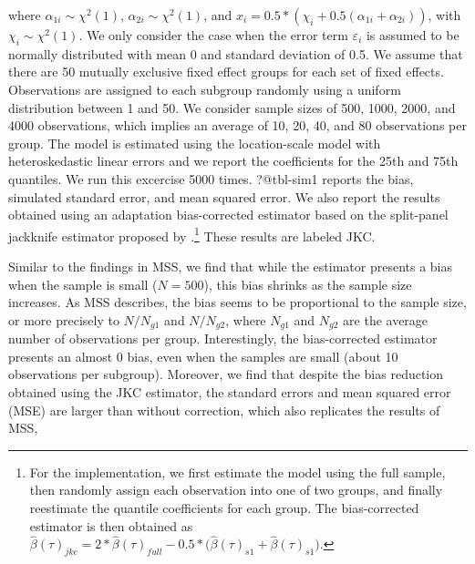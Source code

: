 \documentclass[
  authoryear,
  review,
  1p]{elsarticle}
\begin{document}
where \(\alpha_{1i}\sim \chi^2(1)\), \(\alpha_{2i} \sim \chi^2(1)\), and
\(x_i = 0.5 * (\chi_i +0.5(\alpha_{1i}+\alpha_{2i}))\), with
\(\chi_i \sim \chi^2(1)\). We only consider the case when the error term
\(\varepsilon_i\) is assumed to be normally distributed with mean 0
and standard deviation of 0.5. We assume that there are 50 mutually
exclusive fixed effect groups for each set of fixed effects.
Observations are assigned to each subgroup randomly using a uniform
distribution between 1 and 50. We consider sample sizes of 500, 1000,
2000, and 4000 observations, which implies an average of 10, 20, 40, and
80 observations per group. The model is estimated using the
location-scale model with heteroskedastic linear errors and we report
the coefficients for the 25th and 75th quantiles. We run this excercise
5000 times. ?@tbl-sim1 reports the bias, simulated standard
error, and mean squared error. We also report the results obtained using
an adaptation bias-corrected estimator based on the split-panel
jackknife estimator proposed by \citet{dhaene2015}.\footnote{For the
  implementation, we first estimate the model using the full sample, then
  randomly assign each observation into one of two groups, and finally
  reestimate the quantile coefficients for each group. The
  bias-corrected estimator is then obtained as
  \(\hat\beta(\tau)_{jkc}=2*\hat\beta(\tau)_{full}-0.5*\big(\hat\beta(\tau)_{s1}+\hat\beta(\tau)_{s1}\big)\).}
These results are labeled JKC.

Similar to the findings in MSS, we find that while the estimator presents a
bias when the sample is small (\(N=500\)), this bias shrinks as the
sample size increases. As MSS describes, the bias seems to be
proportional to the sample size, or more precisely to \(N/N_{g1}\) and
\(N/N_{g2}\), where \(N_{g1}\) and \(N_{g2}\) are the average number of
observations per group. Interestingly, the bias-corrected estimator
presents an almost 0 bias, even when the samples are small (about 10
observations per subgroup). Moreover, we find that despite the bias reduction obtained using the JKC estimator, the standard errors and mean squared error (MSE) are larger than without correction, which also replicates the results of MSS,
\end{document}
